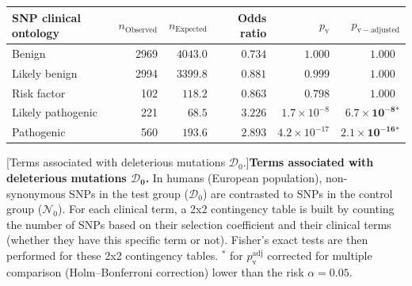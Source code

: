 \documentclass{article}
\newcommand{\SphyDel}{\mathcal{D}_0}
\newcommand{\SphyNeu}{\mathcal{N}_0}
\begin{document}
    \begin{center}
        \begin{tabular}{|l|r|r|r|r|r|}
            \toprule
            SNP clinical ontology & $n_{\mathrm{Observed}}$ & $n_{\mathrm{Expected}}$ & Odds ratio & $p_{\mathrm{v}}$ & $p_{\mathrm{v-adjusted}}$ \\
            \midrule
            Benign                & 2969                    & $4043.0$                & $ 0.734$   & $ 1.000$             & $ 1.000~~$                    \\
            Likely benign         & 2994                    & $3399.8$                & $ 0.881$   & $ 0.999$             & $ 1.000~~$                    \\
            Risk factor           & 102                     & $ 118.2$                & $ 0.863$   & $ 0.798$             & $ 1.000~~$                    \\
            Likely pathogenic     & 221                     & $  68.5$                  & $ 3.226$   & $1.7\times 10^{-8}$  & $\bm{6.7\times 10^{-8}{^*}}$  \\
            Pathogenic            & 560                     & $ 193.6$                & $ 2.893$   & $4.2\times 10^{-17}$ & $\bm{2.1\times 10^{-16}{^*}}$ \\
            \bottomrule
        \end{tabular}
        [Terms associated with deleterious mutations $\SphyDel$.]{\textbf{Terms associated with deleterious mutations $\bm{\SphyDel}$.}
        In humans (European population), non-synonymous SNPs in the test group ($\SphyDel$) are contrasted to SNPs in the control group ($\SphyNeu$).
        For each clinical term, a 2x2 contingency table is built by counting the number of SNPs based on their selection coefficient and their clinical terms (whether they have this specific term or not).
        Fisher's exact tests are then performed for these 2x2 contingency tables.
        $^*$ for $p_{\mathrm{v}}^{\mathrm{adj}}$ corrected for multiple comparison (Holm–Bonferroni correction) lower than the risk $\alpha=0.05$.\label{table:ontology-neg}}
    \end{center}
\end{document}
